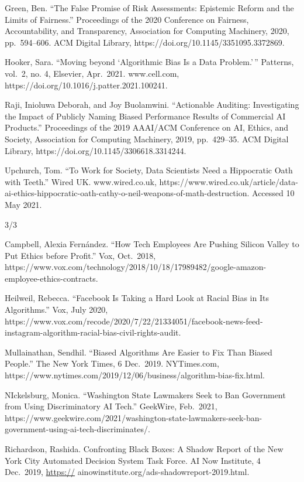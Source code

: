 \documentclass[
]{article}
\newlength{\cslhangindent}
\newlength{\cslentryspacingunit} %
\newenvironment{CSLReferences}[2] %
 {%
  \setlength{\parindent}{0pt}
  \ifodd #1
  \let\oldpar\par
  \def\par{\hangindent=\cslhangindent\oldpar}
  \fi
  \setlength{\parskip}{#2\cslentryspacingunit}
 }%
 {}
\begin{document}
\begin{CSLReferences}{0}{0}
Green, Ben. ``The False Promise of Risk Assessments: Epistemic Reform
and the Limits of Fairness.'' Proceedings of the 2020 Conference on
Fairness, Accountability, and Transparency, Association for Computing
Machinery, 2020, pp.~594--606. ACM Digital Library,
https://doi.org/10.1145/3351095.3372869.

{}

Hooker, Sara. ``Moving beyond `Algorithmic Bias Is a Data Problem.'\,''
Patterns, vol.~2, no. 4, Elsevier, Apr.~2021. www.cell.com,
https://doi.org/10.1016/j.patter.2021.100241.

{}

Raji, Inioluwa Deborah, and Joy Buolamwini. ``Actionable Auditing:
Investigating the Impact of Publicly Naming Biased Performance Results
of Commercial AI Products.'' Proceedings of the 2019 AAAI/ACM Conference
on AI, Ethics, and Society, Association for Computing Machinery, 2019,
pp.~429--35. ACM Digital Library,
https://doi.org/10.1145/3306618.3314244.

{}

Upchurch, Tom. ``To Work for Society, Data Scientists Need a Hippocratic
Oath with Teeth.'' Wired UK. www.wired.co.uk,
https://www.wired.co.uk/article/data-ai-ethics-hippocratic-oath-cathy-o-neil-weapons-of-math-destruction.
Accessed 10 May 2021.

{}

\end{CSLReferences}

3/3

\begin{CSLReferences}{0}{0}
Campbell, Alexia Fernández. ``How Tech Employees Are Pushing Silicon
Valley to Put Ethics before Profit.'' Vox, Oct.~2018,
https://www.vox.com/technology/2018/10/18/17989482/google-amazon-employee-ethics-contracts.

{}

Heilweil, Rebecca. ``Facebook Is Taking a Hard Look at Racial Bias in
Its Algorithms.'' Vox, July 2020,
https://www.vox.com/recode/2020/7/22/21334051/facebook-news-feed-instagram-algorithm-racial-bias-civil-rights-audit.

{}

Mullainathan, Sendhil. ``Biased Algorithms Are Easier to Fix Than Biased
People.'' The New York Times, 6 Dec.~2019. NYTimes.com,
https://www.nytimes.com/2019/12/06/business/algorithm-bias-fix.html.

{}

NIckelsburg, Monica. ``Washington State Lawmakers Seek to Ban Government
from Using Discriminatory AI Tech.'' GeekWire, Feb.~2021,
https://www.geekwire.com/2021/washington-state-lawmakers-seek-ban-government-using-ai-tech-discriminates/.

{}

Richardson, Rashida. Confronting Black Boxes: A Shadow Report of the New
York City Automated Decision System Task Force. AI Now Institute, 4
Dec.~2019, \url{https://} ainowinstitute.org/ads-shadowreport-2019.html.

{}

\end{CSLReferences}
\end{document}
